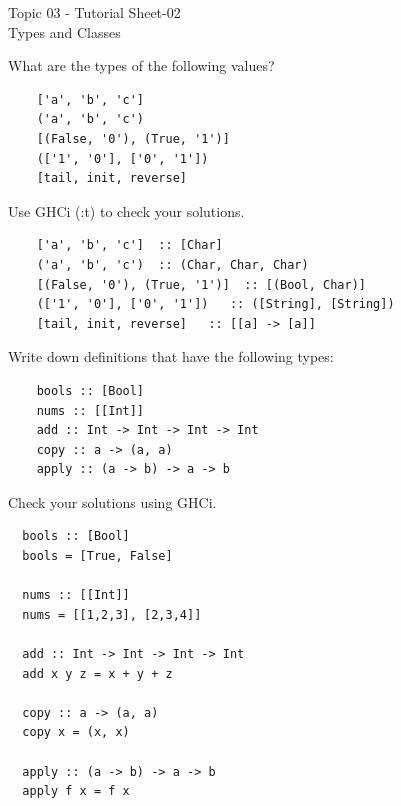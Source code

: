 \documentclass{article}
\newcommand\ExTitle{Types and Classes}
\newcommand\fullExTitle{Topic 03 - Tutorial Sheet-02\\ \ExTitle }
\begin{document}
\begin{Huge}
	\begin{center}
	\fullExTitle
	\end{center}
\end{Huge}

\begin{exercise}
  What are the types of the following values?  
\end{exercise}

\begin{lstlisting}
    ['a', 'b', 'c']
    ('a', 'b', 'c')
    [(False, '0'), (True, '1')]
    (['1', '0'], ['0', '1'])
    [tail, init, reverse]	
\end{lstlisting}

Use GHCi (:t) to check your solutions.

\begin{solution}
\begin{lstlisting}
    ['a', 'b', 'c']  :: [Char]
    ('a', 'b', 'c')  :: (Char, Char, Char)
    [(False, '0'), (True, '1')]  :: [(Bool, Char)]
    (['1', '0'], ['0', '1'])   :: ([String], [String])
    [tail, init, reverse]	:: [[a] -> [a]]
\end{lstlisting}
\end{solution}

\begin{exercise}
   Write down definitions that have the following types:
\end{exercise}

\begin{lstlisting}
    bools :: [Bool]
    nums :: [[Int]]
    add :: Int -> Int -> Int -> Int
    copy :: a -> (a, a)
    apply :: (a -> b) -> a -> b	
\end{lstlisting}

Check your solutions using GHCi.

\begin{solution}
\begin{lstlisting}
  bools :: [Bool]
  bools = [True, False]

  nums :: [[Int]]
  nums = [[1,2,3], [2,3,4]]

  add :: Int -> Int -> Int -> Int
  add x y z = x + y + z

  copy :: a -> (a, a)
  copy x = (x, x)

  apply :: (a -> b) -> a -> b
  apply f x = f x
\end{lstlisting}
\end{solution}
\end{document}
